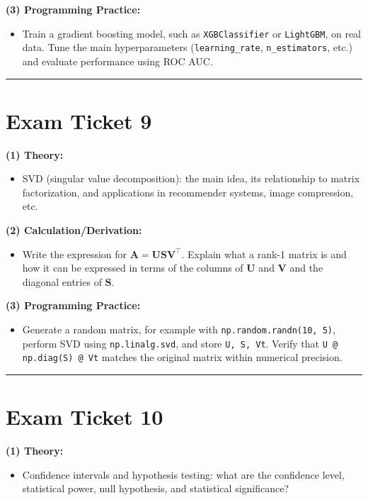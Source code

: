 \documentclass[a4paper,12pt]{article}
\begin{document}
\textbf{(3) Programming Practice:}
\begin{itemize}
  \item Train a gradient boosting model, such as \texttt{XGBClassifier} or \texttt{LightGBM}, on real data. Tune the main hyperparameters (\texttt{learning\_rate}, \texttt{n\_estimators}, etc.) and evaluate performance using ROC AUC.
\end{itemize}

\noindent\rule{\textwidth}{0.4pt}
\newpage

\section*{Exam Ticket 9}
\textbf{(1) Theory:}
\begin{itemize}
  \item SVD (singular value decomposition): the main idea, its relationship to matrix factorization, and applications in recommender systems, image compression, etc.
\end{itemize}

\textbf{(2) Calculation/Derivation:}
\begin{itemize}
  \item Write the expression for $\mathbf{A} = \mathbf{U}\mathbf{S}\mathbf{V}^\top$. Explain what a rank-1 matrix is and how it can be expressed in terms of the columns of $\mathbf{U}$ and $\mathbf{V}$ and the diagonal entries of $\mathbf{S}$.
\end{itemize}

\textbf{(3) Programming Practice:}
\begin{itemize}
  \item Generate a random matrix, for example with \texttt{np.random.randn(10, 5)}, perform SVD using \texttt{np.linalg.svd}, and store \texttt{U, S, Vt}. Verify that \texttt{U @ np.diag(S) @ Vt} matches the original matrix within numerical precision.
\end{itemize}

\noindent\rule{\textwidth}{0.4pt}
\newpage

\section*{Exam Ticket 10}
\textbf{(1) Theory:}
\begin{itemize}
  \item Confidence intervals and hypothesis testing: what are the confidence level, statistical power, null hypothesis, and statistical significance?
\end{itemize}
\end{document}
